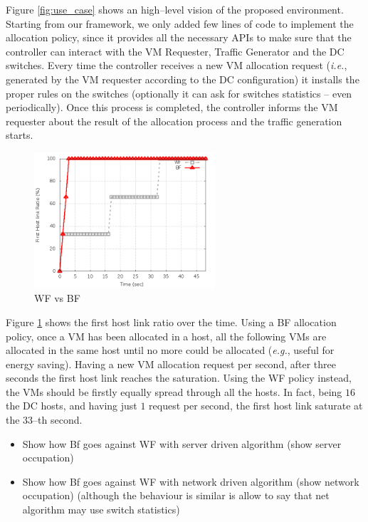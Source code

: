\documentclass[12pt,english,oneside]{book}
\begin{document}
Figure \ref{fig:use_case} shows an high--level vision of the proposed environment. Starting from our framework, we only added few lines of code to implement the allocation policy, since it provides all the necessary APIs to make sure that the controller can interact with the VM Requester, Traffic Generator and the DC switches. Every time the controller receives a new VM allocation request (\textit{i.e.}, generated by the VM requester according to the DC configuration) it installs the proper rules on the switches (optionally it can ask for switches statistics -- even periodically). Once this process is completed, the controller informs the VM requester about the result of the allocation process and the traffic generation starts.


\begin{figure}[h!tbp]
        \centering
        \includegraphics[width=0.6\textwidth]{figures/use_case.png}
        \caption{WF vs BF}
        \label{fig:wf_bf}
\end{figure}

Figure \ref{fig:wf_bf} shows the first host link ratio over the time. Using a BF allocation policy, once a VM has been allocated in a host, all the following VMs are allocated in the same host until no more could be allocated (\textit{e.g.}, useful for energy saving). Having a new VM allocation request per second, after three seconds the first host link reaches the saturation. Using the WF policy instead, the VMs should be firstly equally spread through all the hosts. In fact, being $16$ the DC hosts, and having just $1$ request per second, the first host link saturate at the $33$--th second.


\begin{itemize}
	\item Show how Bf goes against WF with server driven algorithm (show server occupation)
	\item Show how Bf goes against WF with network driven algorithm (show network occupation) (although the behaviour is similar is allow to say that net algorithm may use switch statistics)
\end{itemize}
\newpage
\end{document}
